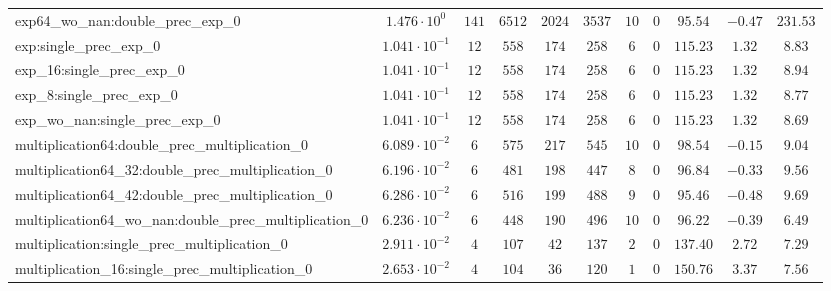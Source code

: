 \begin{tabular}{|l|c|c|c|c|c|c|c|c|c|c|}
exp64\_wo\_nan:double\_prec\_exp\_0                       & $ 1.476 \cdot 10^{0}  $ & $ 141    $ & $ 6512   $ & $ 2024  $ & $ 3537  $ & $ 10  $ & $ 0 $ & $ 95.54       $ & $ -0.47   $ & $ 231.53  $ \\
exp:single\_prec\_exp\_0                                  & $ 1.041 \cdot 10^{-1} $ & $ 12     $ & $ 558    $ & $ 174   $ & $ 258   $ & $ 6   $ & $ 0 $ & $ 115.23      $ & $ 1.32    $ & $ 8.83    $ \\
exp\_16:single\_prec\_exp\_0                              & $ 1.041 \cdot 10^{-1} $ & $ 12     $ & $ 558    $ & $ 174   $ & $ 258   $ & $ 6   $ & $ 0 $ & $ 115.23      $ & $ 1.32    $ & $ 8.94    $ \\
exp\_8:single\_prec\_exp\_0                               & $ 1.041 \cdot 10^{-1} $ & $ 12     $ & $ 558    $ & $ 174   $ & $ 258   $ & $ 6   $ & $ 0 $ & $ 115.23      $ & $ 1.32    $ & $ 8.77    $ \\
exp\_wo\_nan:single\_prec\_exp\_0                         & $ 1.041 \cdot 10^{-1} $ & $ 12     $ & $ 558    $ & $ 174   $ & $ 258   $ & $ 6   $ & $ 0 $ & $ 115.23      $ & $ 1.32    $ & $ 8.69    $ \\
multiplication64:double\_prec\_multiplication\_0          & $ 6.089 \cdot 10^{-2} $ & $ 6      $ & $ 575    $ & $ 217   $ & $ 545   $ & $ 10  $ & $ 0 $ & $ 98.54       $ & $ -0.15   $ & $ 9.04    $ \\
multiplication64\_32:double\_prec\_multiplication\_0      & $ 6.196 \cdot 10^{-2} $ & $ 6      $ & $ 481    $ & $ 198   $ & $ 447   $ & $ 8   $ & $ 0 $ & $ 96.84       $ & $ -0.33   $ & $ 9.56    $ \\
multiplication64\_42:double\_prec\_multiplication\_0      & $ 6.286 \cdot 10^{-2} $ & $ 6      $ & $ 516    $ & $ 199   $ & $ 488   $ & $ 9   $ & $ 0 $ & $ 95.46       $ & $ -0.48   $ & $ 9.69    $ \\
multiplication64\_wo\_nan:double\_prec\_multiplication\_0 & $ 6.236 \cdot 10^{-2} $ & $ 6      $ & $ 448    $ & $ 190   $ & $ 496   $ & $ 10  $ & $ 0 $ & $ 96.22       $ & $ -0.39   $ & $ 6.49    $ \\
multiplication:single\_prec\_multiplication\_0            & $ 2.911 \cdot 10^{-2} $ & $ 4      $ & $ 107    $ & $ 42    $ & $ 137   $ & $ 2   $ & $ 0 $ & $ 137.40      $ & $ 2.72    $ & $ 7.29    $ \\
multiplication\_16:single\_prec\_multiplication\_0        & $ 2.653 \cdot 10^{-2} $ & $ 4      $ & $ 104    $ & $ 36    $ & $ 120   $ & $ 1   $ & $ 0 $ & $ 150.76      $ & $ 3.37    $ & $ 7.56    $ \\

\end{tabular}
